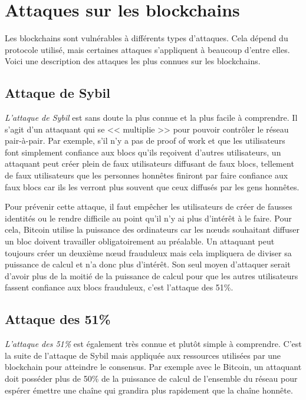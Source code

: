 \newpage

\section{Attaques sur les blockchains}

Les blockchains sont vulnérables à différents types d'attaques. Cela dépend du protocole utilisé, mais certaines attaques s'appliquent à beaucoup d'entre elles. Voici une description des attaques les plus connues sur les blockchains.

\subsection{Attaque de Sybil}

\emph{L'attaque de Sybil} est sans doute la plus connue et la plus facile à comprendre. Il s'agit d'un attaquant qui se << multiplie >> pour pouvoir contrôler le réseau pair-à-pair. Par exemple, s'il n'y a pas de proof of work et que les utilisateurs font simplement confiance aux blocs qu'ils reçoivent d'autres utilisateurs, un attaquant peut créer plein de faux utilisateurs diffusant de faux blocs, tellement de faux utilisateurs que les personnes honnêtes finiront par faire confiance aux faux blocs car ils les verront plus souvent que ceux diffusés par les gens honnêtes.

Pour prévenir cette attaque, il faut empêcher les utilisateurs de créer de fausses identités ou le rendre difficile au point qu'il n'y ai plus d'intérêt à le faire. Pour cela, Bitcoin utilise la puissance des ordinateurs car les nœuds souhaitant diffuser un bloc doivent travailler obligatoirement au préalable. Un attaquant peut toujours créer un deuxième nœud frauduleux mais cela impliquera de diviser sa puissance de calcul et n'a donc plus d'intérêt. Son seul moyen d'attaquer serait d'avoir plus de la moitié de la puissance de calcul pour que les autres utilisateurs fassent confiance aux blocs frauduleux, c'est l'attaque des 51\%.

\subsection{Attaque des 51\%}

\emph{L'attaque des 51\%} est également très connue et plutôt simple à comprendre. C'est la suite de l'attaque de Sybil mais appliquée aux ressources utilisées par une blockchain pour atteindre le consensus. Par exemple avec le Bitcoin, un attaquant doit posséder plus de 50\% de la puissance de calcul de l'ensemble du réseau pour espérer émettre une chaîne qui grandira plus rapidement que la chaîne honnête.

